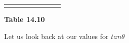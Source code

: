 \begin{center}
\begin{xtabular*}{\mytablewidth}[t]{|p{10\mystarwidth}|p{10\mystarwidth}|p{10\mystarwidth}|p{10\mystarwidth}|p{10\mystarwidth}|p{10\mystarwidth}|p{10\mystarwidth}|p{10\mystarwidth}|}
{    \addtocounter{footnote}{-0}
    
                }
     \tabularnewline{}
    \end{xtabular*}
      \end{center}
    \begin{center}{\small\bfseries Table 14.10}\end{center}
    
    \addtocounter{footnote}{-0}
    
    \par
  
        
        
        

        \label{m39414*id89576}Let us look back at our values for \begin{math}tan\theta \end{math}\par 
        
    
